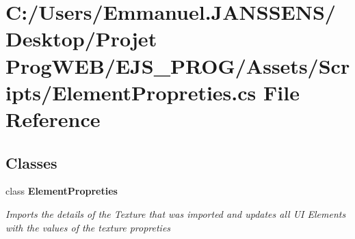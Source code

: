 \section{C\+:/\+Users/\+Emmanuel.J\+A\+N\+S\+S\+E\+N\+S/\+Desktop/\+Projet Prog\+W\+E\+B/\+E\+J\+S\+\_\+\+P\+R\+O\+G/\+Assets/\+Scripts/\+Element\+Propreties.cs File Reference}
\label{_element_propreties_8cs}
\subsection*{Classes}
\begin{DoxyCompactItemize}
\item 
class \textbf{ Element\+Propreties}
\begin{DoxyCompactList}\small\item\em Imports the details of the Texture that was imported and updates all UI Elements with the values of the texture propreties \end{DoxyCompactList}\end{DoxyCompactItemize}
